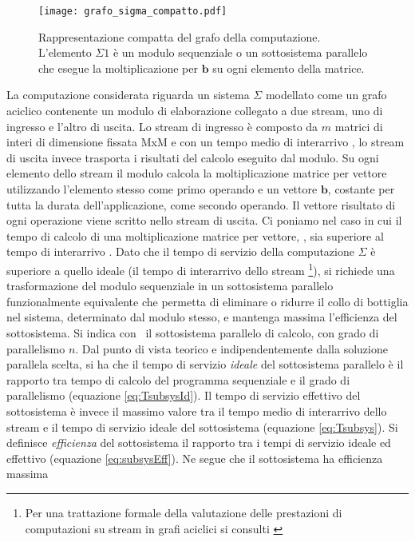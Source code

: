 \begin{figure}[!tb]
  \centering
  \texttt{[image: grafo\_sigma\_compatto.pdf]}
  \caption[Computazione sequenziale del benchmark]{Rappresentazione compatta del grafo della computazione. L'elemento $\Sigma1$ \`e un modulo sequenziale o un sottosistema parallelo che esegue la moltiplicazione per $\mathbf{b}$ su ogni elemento della matrice. }
  \label{fig:sigma_compatto}
\end{figure}
La computazione considerata riguarda un sistema $\Sigma$ modellato come un grafo aciclico contenente un modulo di elaborazione collegato a due stream, uno di ingresso e l'altro di uscita. Lo stream di ingresso \`e composto da $m$ matrici di interi di dimensione fissata MxM e con un tempo medio di interarrivo \Ta, lo stream di uscita invece trasporta i risultati del calcolo eseguito dal modulo. Su ogni elemento dello stream il modulo calcola la moltiplicazione matrice per vettore utilizzando l'elemento stesso come primo operando e un vettore $\mathbf{b}$, costante per tutta la durata dell'applicazione, come secondo operando. Il vettore risultato di ogni operazione viene scritto nello stream di uscita. 
Ci poniamo nel caso in cui il tempo di calcolo di una moltiplicazione matrice per vettore, \Tcalc, sia superiore al tempo di interarrivo \Ta. Dato che il tempo di servizio della computazione $\Sigma$ \`e  superiore a quello ideale (il tempo di interarrivo dello stream \footnote{Per una trattazione formale della valutazione delle prestazioni di computazioni su stream in grafi aciclici si consulti \cite{hpc_part1}}), si richiede una trasformazione del modulo sequenziale in un sottosistema parallelo funzionalmente equivalente che permetta di eliminare o ridurre il collo di bottiglia nel sistema, determinato dal modulo stesso, e mantenga massima l'efficienza del sottosistema. 
Si indica con \subsystem\ il sottosistema parallelo di calcolo, con grado di parallelismo $n$. 
Dal punto di vista teorico e indipendentemente dalla soluzione parallela scelta, si ha che il tempo di servizio \emph{ideale} del sottosistema parallelo \`e il rapporto tra tempo di calcolo del programma sequenziale e il grado di parallelismo (equazione \ref{eq:TsubsysId}). Il tempo di servizio effettivo del sottosistema \`e invece il massimo valore tra il tempo medio di interarrivo dello stream e il tempo di servizio ideale del sottosistema (equazione \ref{eq:Tsubsys}). Si definisce \emph{efficienza} del sottosistema il rapporto tra i tempi di servizio ideale ed effettivo (equazione \ref{eq:subsysEff}). Ne segue che il sottosistema ha efficienza massima 

